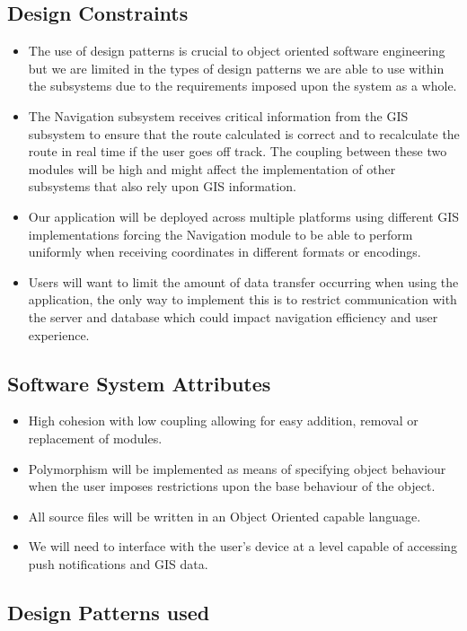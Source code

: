 \documentclass[a4paper,12pt]{article}
\begin{document}
	\subsection{Design Constraints}
	\begin{itemize}
		\small
		\item The use of design patterns is crucial to object oriented software engineering but we are limited 
			in the types of design patterns we are able to use within the subsystems due to the requirements 
			imposed upon the system as a whole.
		\item The Navigation subsystem receives critical information from the GIS subsystem to ensure that the route
			calculated is correct and to recalculate the route in real time if the user goes off track. The coupling between these two modules will be high and might affect the implementation of other subsystems that also rely upon GIS information.
		\item Our application will be deployed across multiple platforms using different GIS implementations forcing the Navigation module to be able to perform uniformly when receiving coordinates in different formats or encodings.
		\item Users will want to limit the amount of data transfer occurring when using the application, the only way to implement this is to restrict communication with the server and database which could impact navigation efficiency and user experience.
	\end{itemize}
	
	\subsection{Software System Attributes}
	\begin{itemize}
		\small 
		\item High cohesion with low coupling allowing for easy addition, removal or replacement of modules.
		\item Polymorphism will be implemented as means of specifying object behaviour when the user imposes restrictions upon the base behaviour of the object.
		\item All source files will be written in an Object Oriented capable language.
		\item We will need to interface with the user's device at a level capable of accessing push notifications and 
		 GIS data.
	\end{itemize}
	
	\subsection{Design Patterns used}
\end{document}
